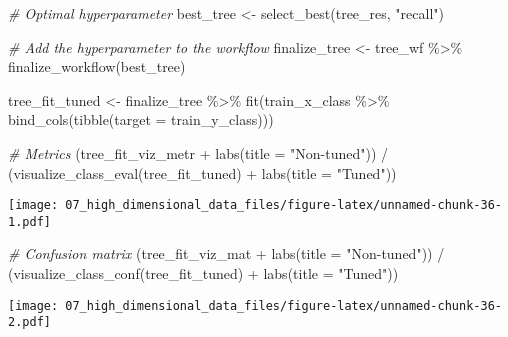 \documentclass[
]{book}
\newenvironment{Shaded}{\begin{snugshade}}{\end{snugshade}}
\newcommand{\AttributeTok}[1]{\textcolor[rgb]{0.77,0.63,0.00}{#1}}
\newcommand{\CommentTok}[1]{\textcolor[rgb]{0.56,0.35,0.01}{\textit{#1}}}
\newcommand{\FunctionTok}[1]{\textcolor[rgb]{0.00,0.00,0.00}{#1}}
\newcommand{\NormalTok}[1]{#1}
\newcommand{\OtherTok}[1]{\textcolor[rgb]{0.56,0.35,0.01}{#1}}
\newcommand{\SpecialCharTok}[1]{\textcolor[rgb]{0.00,0.00,0.00}{#1}}
\newcommand{\StringTok}[1]{\textcolor[rgb]{0.31,0.60,0.02}{#1}}
\begin{document}
\begin{Shaded}
\begin{Highlighting}[]
\CommentTok{\# Optimal hyperparameter}
\NormalTok{best\_tree }\OtherTok{\textless{}{-}} \FunctionTok{select\_best}\NormalTok{(tree\_res, }\StringTok{"recall"}\NormalTok{)}

\CommentTok{\# Add the hyperparameter to the workflow }
\NormalTok{finalize\_tree }\OtherTok{\textless{}{-}}\NormalTok{ tree\_wf }\SpecialCharTok{\%\textgreater{}\%}
  \FunctionTok{finalize\_workflow}\NormalTok{(best\_tree)}
\end{Highlighting}
\end{Shaded}

\begin{Shaded}
\begin{Highlighting}[]
\NormalTok{tree\_fit\_tuned }\OtherTok{\textless{}{-}}\NormalTok{ finalize\_tree }\SpecialCharTok{\%\textgreater{}\%} 
  \FunctionTok{fit}\NormalTok{(train\_x\_class }\SpecialCharTok{\%\textgreater{}\%} \FunctionTok{bind\_cols}\NormalTok{(}\FunctionTok{tibble}\NormalTok{(}\AttributeTok{target =}\NormalTok{ train\_y\_class)))}

\CommentTok{\# Metrics }
\NormalTok{(tree\_fit\_viz\_metr }\SpecialCharTok{+} \FunctionTok{labs}\NormalTok{(}\AttributeTok{title =} \StringTok{"Non{-}tuned"}\NormalTok{)) }\SpecialCharTok{/}\NormalTok{ (}\FunctionTok{visualize\_class\_eval}\NormalTok{(tree\_fit\_tuned) }\SpecialCharTok{+} \FunctionTok{labs}\NormalTok{(}\AttributeTok{title =} \StringTok{"Tuned"}\NormalTok{))}
\end{Highlighting}
\end{Shaded}

\texttt{[image: 07\_high\_dimensional\_data\_files/figure-latex/unnamed-chunk-36-1.pdf]}

\begin{Shaded}
\begin{Highlighting}[]
\CommentTok{\# Confusion matrix }
\NormalTok{(tree\_fit\_viz\_mat }\SpecialCharTok{+} \FunctionTok{labs}\NormalTok{(}\AttributeTok{title =} \StringTok{"Non{-}tuned"}\NormalTok{)) }\SpecialCharTok{/}\NormalTok{ (}\FunctionTok{visualize\_class\_conf}\NormalTok{(tree\_fit\_tuned) }\SpecialCharTok{+} \FunctionTok{labs}\NormalTok{(}\AttributeTok{title =} \StringTok{"Tuned"}\NormalTok{))}
\end{Highlighting}
\end{Shaded}

\texttt{[image: 07\_high\_dimensional\_data\_files/figure-latex/unnamed-chunk-36-2.pdf]}
\end{document}
